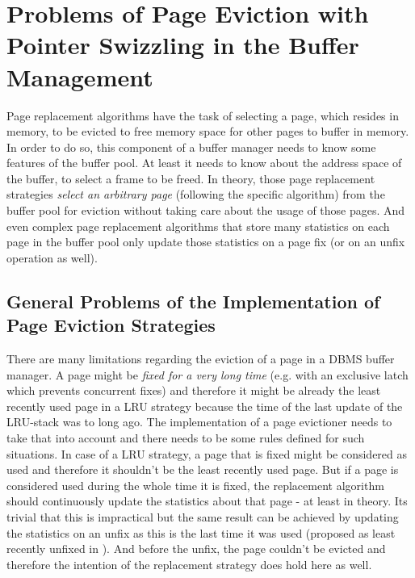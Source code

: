 \section[Problems of Page Eviction with Pointer Swizzling]{Problems of Page Eviction with Pointer Swizzling in the Buffer Management}

	Page replacement algorithms have the task of selecting a page, which resides in memory, to be evicted to free memory space for other pages to buffer in memory. In order to do so, this component of a buffer manager needs to know some features of the buffer pool. At least it needs to know about the address space of the buffer, to select a frame to be freed. In theory, those page replacement strategies \emph{select an arbitrary page} (following the specific algorithm) from the buffer pool for eviction without taking care about the usage of those pages. And even complex page replacement algorithms that store many statistics on each page in the buffer pool only update those statistics on a page fix (or on an unfix operation as well). 

\subsection[General Problems of the Implementation]{General Problems of the Implementation of Page Eviction Strategies}
	
	There are many limitations regarding the eviction of a page in a DBMS buffer manager. A page might be \emph{fixed for a very long time} (e.g. with an exclusive latch which prevents concurrent fixes) and therefore it might be already the least recently used page in a LRU strategy because the time of the last update of the LRU-stack was to long ago. The implementation of a page evictioner needs to take that into account and there needs to be some rules defined for such situations. In case of a LRU strategy, a page that is fixed might be considered as used and therefore it shouldn't be the least recently used page. But if a page is considered used during the whole time it is fixed, the replacement algorithm should continuously update the statistics about that page - at least in theory. Its trivial that this is impractical but the same result can be achieved by updating the statistics on an unfix as this is the last time it was used (proposed as least recently unfixed in \cite{Effelsberg:1984}). And before the unfix, the page couldn't be evicted and therefore the intention of the replacement strategy does hold here as well.
	
